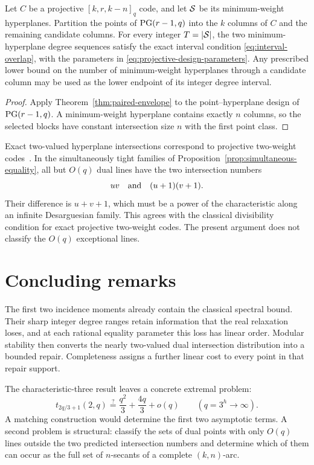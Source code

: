 \begin{corollary}\label{cor:projective-codes}
Let \(C\) be a projective \([k,r,k-n]_q\) code, and let \(\mathcal S\) be its
minimum-weight hyperplanes.  Partition the points of \(\mathrm{PG}(r-1,q)\) into the
\(k\) columns of \(C\) and the remaining candidate columns.  For every
integer \(T=|\mathcal S|\), the two minimum-hyperplane degree sequences satisfy the
exact interval condition \eqref{eq:interval-overlap}, with the parameters in
\eqref{eq:projective-design-parameters}.  Any prescribed lower bound on the
number of minimum-weight hyperplanes through a candidate column may be used
as the lower endpoint of its integer degree interval.
\end{corollary}

\begin{proof}
Apply Theorem~\ref{thm:paired-envelope} to the point--hyperplane design of
\(\mathrm{PG}(r-1,q)\).  A minimum-weight hyperplane contains exactly \(n\) columns,
so the selected blocks have constant intersection size \(n\) with the first
point class.
\end{proof}

Exact two-valued hyperplane intersections correspond to projective two-weight
codes~\cite{CalderbankKantor}.  In the simultaneously tight families of
Proposition~\ref{prop:simultaneous-equality}, all but \(O(q)\) dual lines have
the two intersection numbers
\[
 uv\quad\hbox{and}\quad (u+1)(v+1).
\]
Their difference is \(u+v+1\), which must be a power of the characteristic
along an infinite Desarguesian family.  This agrees with the classical
divisibility condition for exact projective two-weight codes.  The present
argument does not classify the \(O(q)\) exceptional lines.

\section{Concluding remarks}\label{sec:conclusion}

The first two incidence moments already contain the classical spectral bound.
Their sharp integer degree ranges retain information that the real relaxation
loses, and at each rational equality parameter this loss has linear order.
Modular stability then converts the nearly two-valued dual intersection
distribution into a bounded repair.  Completeness assigns a further linear
cost to every point in that repair support.

The characteristic-three result leaves a concrete extremal problem:
\begin{equation}\label{eq:open-asymptotic}
 t_{2q/3+1}(2,q)
 \stackrel{?}{=}\frac{q^2}{3}+\frac{4q}{3}+o(q)
 \qquad(q=3^h\to\infty).
\end{equation}
A matching construction would determine the first two asymptotic terms.  A
second problem is structural: classify the sets of dual points with only
\(O(q)\) lines outside the two predicted intersection numbers and determine
which of them can occur as the full set of \(n\)-secants of a complete
\((k,n)\)-arc.
